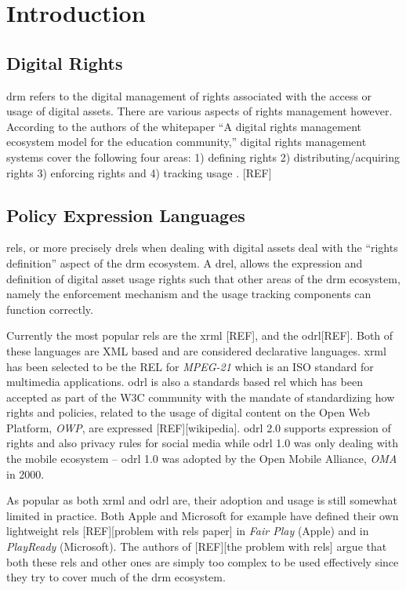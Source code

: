 \chapter{Introduction}

\section{Digital Rights} 

\ac{drm} refers to the digital management of rights associated with the access or usage of digital assets. There are various aspects of rights management however. According to the authors of the whitepaper ``A digital rights management ecosystem model for the education community,'' digital rights management systems cover the following four areas: 1) defining rights 2) distributing/acquiring rights 3) enforcing rights and 4) tracking usage \cite{collier}. [REF]

\section{Policy Expression Languages}

\ac{rel}s, or more precisely \ac{drel}s when dealing with digital assets deal with the ``rights definition'' aspect of the \ac{drm} ecosystem. A \ac{drel}, allows the expression and definition of digital asset usage rights such that other areas of the \ac{drm} ecosystem, namely the enforcement mechanism and the usage tracking components can function correctly.

Currently the most popular \ac{rel}s are the \ac{xrml} [REF], and the \ac{odrl}[REF]. Both of these languages are XML based and are considered declarative languages. \ac{xrml} has been selected to be the REL for \emph{MPEG-21} which is an ISO standard for multimedia applications. \ac{odrl} is also a standards based \ac{rel} which has been accepted as part of the W3C community with the mandate of standardizing how rights and policies, related to the usage of digital content on the Open Web Platform, \emph{OWP}, are expressed [REF][wikipedia]. \ac{odrl} 2.0 supports expression of rights and also privacy rules for social media while \ac{odrl} 1.0 was only dealing with the mobile ecosystem -- \ac{odrl} 1.0 was adopted by the Open Mobile Alliance, \emph{OMA} in 2000.

As popular as both \ac{xrml} and \ac{odrl} are, their adoption and usage is still somewhat limited in practice. Both Apple and Microsoft for example have defined their own lightweight \ac{rel}s [REF][problem with \ac{rel}s paper] in \emph{Fair Play} (Apple) and in \emph{PlayReady} (Microsoft). The authors of [REF][the problem with \ac{rel}s] argue that both these \ac{rel}s and other ones are simply too complex to be used effectively since they try to cover much of the \ac{drm} ecosystem. 

